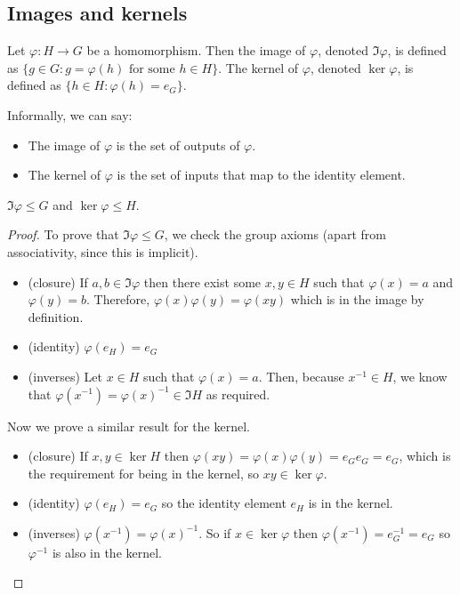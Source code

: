 \subsection{Images and kernels}
\begin{definition}
	Let \(\varphi: H \to G\) be a homomorphism.
	Then the image of \(\varphi\), denoted \(\Im \varphi\), is defined as \(\{ g \in G : g = \varphi(h) \text{ for some } h \in H \}\).
	The kernel of \(\varphi\), denoted \(\ker \varphi\), is defined as \(\{ h \in H : \varphi(h) = e_G \}\).
\end{definition}
Informally, we can say:
\begin{itemize}
	\item The image of \(\varphi\) is the set of outputs of \(\varphi\).
	\item The kernel of \(\varphi\) is the set of inputs that map to the identity element.
\end{itemize}
\begin{proposition}
	\(\Im \varphi \leq G\) and \(\ker \varphi \leq H\).
\end{proposition}
\begin{proof}
	To prove that \(\Im \varphi \leq G\), we check the group axioms (apart from associativity, since this is implicit).
	\begin{itemize}
		\item (closure) If \(a, b \in \Im \varphi\) then there exist some \(x, y \in H\) such that \(\varphi(x) = a\) and \(\varphi(y) = b\).
		      Therefore, \(\varphi(x)\varphi(y)=\varphi(xy)\) which is in the image by definition.
		\item (identity) \(\varphi(e_H) = e_G\)
		\item (inverses) Let \(x \in H\) such that \(\varphi(x) = a\).
		      Then, because \(x^{-1}\in H\), we know that \(\varphi(x^{-1}) = \varphi(x)^{-1} \in \Im H\) as required.
	\end{itemize}
	Now we prove a similar result for the kernel.
	\begin{itemize}
		\item (closure) If \(x, y \in \ker H\) then \(\varphi(xy) = \varphi(x) \varphi(y) = e_G e_G = e_G\), which is the requirement for being in the kernel, so \(xy \in \ker \varphi\).
		\item (identity) \(\varphi(e_H) = e_G\) so the identity element \(e_H\) is in the kernel.
		\item (inverses) \(\varphi(x^{-1}) = \varphi(x)^{-1}\).
		      So if \(x \in \ker \varphi\) then \(\varphi(x^{-1}) = e_G^{-1} = e_G\) so \(\varphi^{-1}\) is also in the kernel.
	\end{itemize}
\end{proof}
